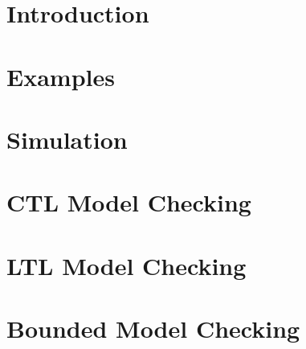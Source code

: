 \documentclass[10pt]{report}
\begin{document}




\tableofcontents

\chapter{Introduction}
\label{Introduction}


\chapter{Examples}
\label{Examples}


\chapter{Simulation}
\label{Simulation}


\chapter{CTL Model Checking}
\label{CTL Model Checking}


\chapter{LTL Model Checking}
\label{LTL Model Checking}


\chapter{Bounded Model Checking}
\label{Bounded Model Checking}







\cleardoublepage

\printindex[com]
\printindex[var]
\printindex
\end{document}
